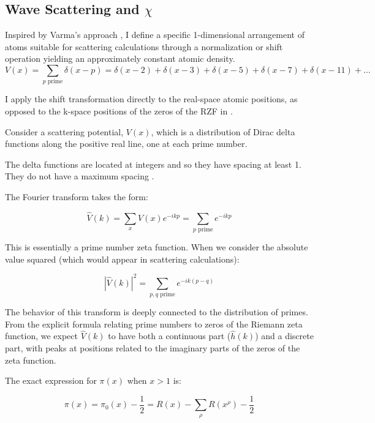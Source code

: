 \documentclass[11pt, oneside]{article}
\begin{document}
\subsection{Wave Scattering and $\chi$}
Inspired by Varma's approach \cite{Varma2016}, I define a specific 1-dimensional arrangement of atoms suitable for scattering calculations through a normalization or shift operation yielding an approximately constant atomic density.
\begin{equation}
V(x) = \sum_{p \text{ prime}} \delta(x - p) = \delta(x - 2) + \delta(x - 3) + \delta(x - 5) + \delta(x - 7) + \delta(x - 11) + ...
\end{equation}


I apply the shift transformation directly to the real-space atomic positions, as opposed to the k-space positions of the zeros of the RZF in \cite{Varma2016}.

Consider a scattering potential, $V(x)$, which is a distribution of Dirac delta functions along the positive real line, one at each prime number.

The delta functions are located at integers and so they have spacing at least 1. They do not have a maximum spacing \cite{Westzynthius1931, Erdos1950}.

The Fourier transform takes the form:

\begin{equation}
\hat{V}(k) = \sum_{x} V(x) e^{-ikp} =  \sum_{p \text{ prime}} e^{-ikp}
\end{equation}

This is essentially a prime number zeta function. When we consider the absolute value squared (which would appear in scattering calculations):

\begin{equation}
|\hat{V}(k)|^2 = \sum_{p,q \text{ prime}} e^{-ik(p-q)}
\end{equation}

The behavior of this transform is deeply connected to the distribution of primes. From the explicit formula relating prime numbers to zeros of the Riemann zeta function, we expect $\hat{V}(k)$ to have both a continuous part ($\hat{h}(k)$) and a discrete part, with peaks at positions related to the imaginary parts of the zeros of the zeta function.


The exact expression \cite{Riemann1859} for $\pi(x)$ when $x>1$ is:

\begin{equation}
\pi(x) = \pi_0(x) - \frac{1}{2} = R(x) - \sum_{\rho}R(x^{\rho}) - \frac{1}{2}
\end{equation}
\end{document}
